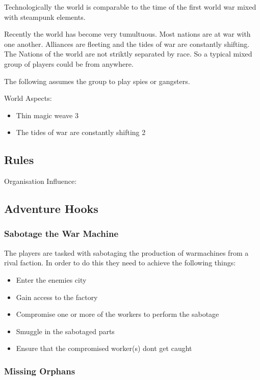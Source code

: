 \documentclass[11pt]{article}
\begin{document}
{Technologically the world is comparable to the time of the first world war mixed with steampunk elements.

Recently the world has become very tumultuous. Most nations are at war with one another. Alliances are fleeting and the tides of war are constantly shifting. The Nations of the world are not striktly separated by race. So a typical mixed group of players could be from anywhere. 

The following assumes the group to play spies or gangsters.

World Aspects:
\begin{itemize}
\item Thin magic weave 3
\item The tides of war are constantly shifting 2
\end{itemize}

\subsection{Rules}
\label{sec:org1186cb5}

Organisation Influence:



\subsection{Adventure Hooks}
\label{sec:org671f697}

\subsubsection{Sabotage the War Machine}
\label{sec:org206a6a7}
The players are tasked with sabotaging the production of warmachines from a rival faction. In order to do this they need to achieve the following things:
\begin{itemize}
\item Enter the enemies city
\item Gain access to the factory
\item Compromise one or more of the workers to perform the sabotage
\item Smuggle in the sabotaged parts
\item Ensure that the compromised worker(s) dont get caught
\end{itemize}




\subsubsection{Missing Orphans}
\label{sec:orgfa6d033}

}
\end{document}
